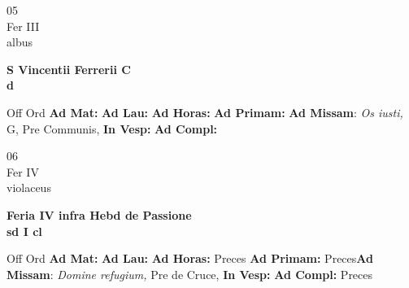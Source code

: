 \documentclass[10pt, openany]{book}
\begin{document}
        \begin{center}
            \begin{minipage}{3.5in}
                \vspace{2em}
                \begin{minipage}{0.5in}
                    {\Huge 05} \\
                    {\normalsize Fer III} \\
                    {\normalsize albus}
                \end{minipage}
                \begin{minipage}{3.0in}
                    \textbf{ \large S Vincentii Ferrerii C \\
                    \textnormal{\normalsize d}} \\ 
                \end{minipage}
                \begin{justify}Off Ord
                    \textbf{Ad Mat: }
                    \textbf{Ad Lau: }
                    \textbf{Ad Horas: }
                    \textbf{Ad Primam: }\textbf{Ad Missam}: \textit{Os iusti,} G, Pre Communis,  
                    \textbf{In Vesp: }
                    \textbf{Ad Compl: }
                \end{justify}
            \end{minipage}
        \end{center}
    
        \begin{center}
            \begin{minipage}{3.5in}
                \vspace{2em}
                \begin{minipage}{0.5in}
                    {\Huge 06} \\
                    {\normalsize Fer IV} \\
                    {\normalsize violaceus}
                \end{minipage}
                \begin{minipage}{3.0in}
                    \textbf{ \large Feria IV infra Hebd de Passione \\
                    \textnormal{\normalsize sd I cl}} \\ 
                \end{minipage}
                \begin{justify}Off Ord
                    \textbf{Ad Mat: }
                    \textbf{Ad Lau: }
                    \textbf{Ad Horas: }Preces
                    \textbf{Ad Primam: }Preces\textbf{Ad Missam}: \textit{Domine refugium,} Pre de Cruce,  
                    \textbf{In Vesp: }
                    \textbf{Ad Compl: }Preces
                \end{justify}
            \end{minipage}
        \end{center}
    
\end{document}

